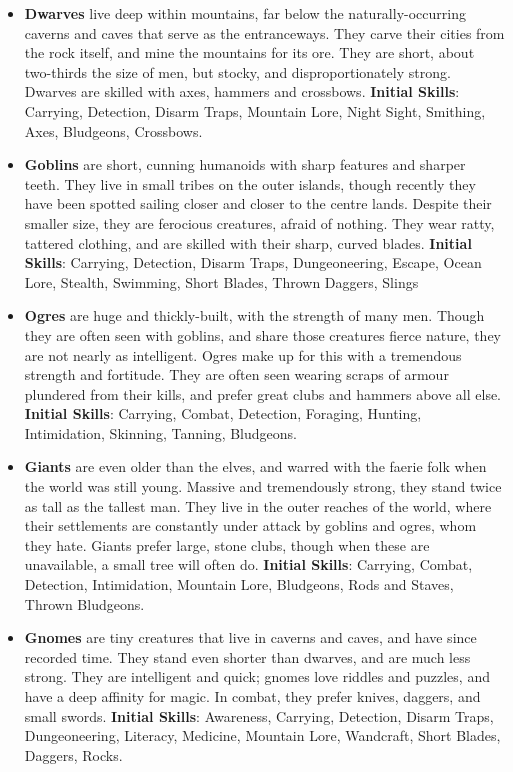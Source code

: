 \begin{itemize}
\item {\bf Dwarves} live deep within mountains, far below the 
naturally-occurring caverns and caves that serve as the entranceways.  They
carve their cities from the rock itself, and mine the mountains for its 
ore.  They are short, about two-thirds the size of men, but stocky, and 
disproportionately strong.  Dwarves are skilled with axes, hammers and 
crossbows. \textbf{Initial Skills}: Carrying, Detection, Disarm Traps,
Mountain Lore, Night Sight, Smithing, Axes, Bludgeons, Crossbows.

\item {\bf Goblins} are short, cunning humanoids with sharp features and 
sharper teeth.  They live in small tribes on the outer islands, though 
recently they have been spotted sailing closer and closer to the centre 
lands.  Despite their smaller size, they are ferocious creatures, afraid of 
nothing.  They wear ratty, tattered clothing, and are skilled with their 
sharp, curved blades. \textbf{Initial Skills}: Carrying, Detection,
Disarm Traps, Dungeoneering, Escape, Ocean Lore, Stealth, Swimming, 
Short Blades, Thrown Daggers, Slings

\item {\bf Ogres} are huge and thickly-built, with the strength of many 
men.  Though they are often seen with goblins, and share those creatures 
fierce nature, they are not nearly as intelligent.  Ogres make up for this 
with a tremendous strength and fortitude.  They are often seen wearing 
scraps of armour plundered from their kills, and prefer great clubs and 
hammers above all else. \textbf{Initial Skills}: Carrying, Combat,
Detection, Foraging, Hunting, Intimidation, Skinning, Tanning, Bludgeons.

\item {\bf Giants} are even older than the elves, and warred with the 
faerie folk when the world was still young.  Massive and tremendously 
strong, they stand twice as tall as the tallest man.  They live in the 
outer reaches of the world, where their settlements are constantly under 
attack by goblins and ogres, whom they hate. Giants prefer large, stone 
clubs, though when these are unavailable, a small tree will often do.
\textbf{Initial Skills}: Carrying, Combat, Detection, Intimidation,
Mountain Lore, Bludgeons, Rods and Staves, Thrown Bludgeons.

\item {\bf Gnomes} are tiny creatures that live in caverns and caves, and 
have since recorded time.  They stand even shorter than dwarves, and are 
much less strong.  They are intelligent and quick; gnomes love riddles and 
puzzles, and have a deep affinity for magic.  In combat, they prefer knives,
daggers, and small swords. \textbf{Initial Skills}: Awareness, Carrying,
Detection, Disarm Traps, Dungeoneering, Literacy, Medicine, Mountain Lore, 
Wandcraft, Short Blades, Daggers, Rocks.
\end{itemize}

